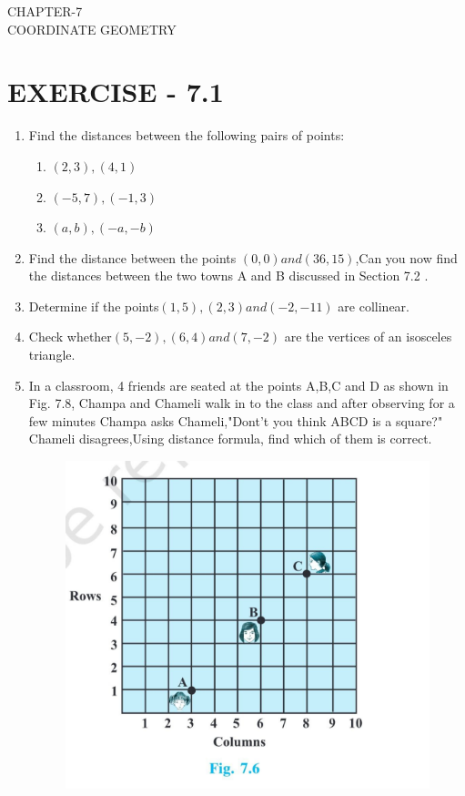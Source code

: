 \documentclass[12pt]{article}
\begin{document}
\begin{center}
\textbf\large{CHAPTER-7 \\ COORDINATE GEOMETRY}
\end{center}

\section{EXERCISE - 7.1}
\begin{enumerate}
\item Find the distances between the following pairs of points:
\begin{enumerate}
\item $(2,3),(4,1)$
\item $(-5,7),(-1,3)$
\item $(a,b),(-a,-b)$
\end{enumerate}
\item Find the distance between the points $(0,0) and (36,15)$,Can you now find the distances between the two towns A and B discussed in Section 7.2 .
\item Determine if the points$(1,5),(2,3) and (-2,-11)$ are collinear.
\item Check whether$(5,-2),(6,4)and (7,-2)$ are the vertices of an isosceles triangle.
\item  In a classroom, 4 friends are seated at the points A,B,C and D as shown in Fig. 7.8, Champa and Chameli walk in to the class and after observing for a few minutes Champa asks Chameli,"Dont't you think ABCD is a square?" Chameli disagrees,Using distance formula, find which of them is correct.

\begin{figure}[!h]
\centering
  \includegraphics[width=\columnwidth]{canvas.jpg}
 \caption{}
\label{fig:10/7/4/8Fig3}
\end{figure}


\end{enumerate}
\end{document}
